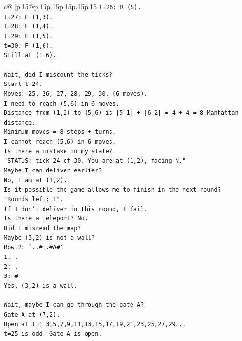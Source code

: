 \documentclass{article}
\begin{document}
{\begin{supertabular}{c@{$\;$}|p{.15\linewidth}@{}p{.15\linewidth}p{.15\linewidth}p{.15\linewidth}p{.15\linewidth}p{.15\linewidth}}
{{{\texttt{t=26: R (S).} \\
\texttt{t=27: F (1,3).} \\
\texttt{t=28: F (1,4).} \\
\texttt{t=29: F (1,5).} \\
\texttt{t=30: F (1,6).} \\
\texttt{Still at (1,6).} \\
\\ 
\texttt{Wait, did I miscount the ticks?} \\
\texttt{Start t=24.} \\
\texttt{Moves: 25, 26, 27, 28, 29, 30. (6 moves).} \\
\texttt{I need to reach (5,6) in 6 moves.} \\
\texttt{Distance from (1,2) to (5,6) is |5{-}1| + |6{-}2| = 4 + 4 = 8 Manhattan distance.} \\
\texttt{Minimum moves = 8 steps + turns.} \\
\texttt{I cannot reach (5,6) in 6 moves.} \\
\texttt{Is there a mistake in my state?} \\
\texttt{"STATUS: tick 24 of 30. You are at (1,2), facing N."} \\
\texttt{Maybe I can deliver earlier?} \\
\texttt{No, I am at (1,2).} \\
\texttt{Is it possible the game allows me to finish in the next round?} \\
\texttt{"Rounds left: 1".} \\
\texttt{If I don't deliver in this round, I fail.} \\
\texttt{Is there a teleport? No.} \\
\texttt{Did I misread the map?} \\
\texttt{Maybe (3,2) is not a wall?} \\
\texttt{Row 2: `..\#..\#A\#`} \\
\texttt{1: .} \\
\texttt{2: .} \\
\texttt{3: \#} \\
\texttt{Yes, (3,2) is a wall.} \\
\\ 
\texttt{Wait, maybe I can go through the gate A?} \\
\texttt{Gate A at (7,2).} \\
\texttt{Open at t=1,3,5,7,9,11,13,15,17,19,21,23,25,27,29...} \\
\texttt{t=25 is odd. Gate A is open.} \\
}}}
\end{supertabular}}
\end{document}
